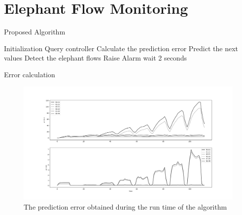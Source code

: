 \documentclass[aspectratio=43]{beamer}
\begin{document}
\section{Elephant Flow Monitoring}

\begin{frame}{Proposed Algorithm}
    \begin{algorithm}[H]
        \caption{Elephant Detection Algorithm - High Level} \label{alg:high_level}
        \begin{algorithmic}[1]
                \State Initialization
                \Loop
                    \State Query controller
                    \State Calculate the prediction error
                    \State Predict the next values
                    \State Detect the elephant flows
                        \State Raise Alarm
                    \EndIf
                    \State wait 2 seconds
                \EndLoop
            \EndProcedure 
           \end{algorithmic}
    \end{algorithm}
\end{frame}

\begin{frame}{Error calculation}
    \begin{figure}
        \includegraphics[width=1\textwidth]{meter_eleph/error_plot_sse}
        \caption{The prediction error obtained during the run time of the algorithm}
    \end{figure}
\end{frame}
\end{document}
